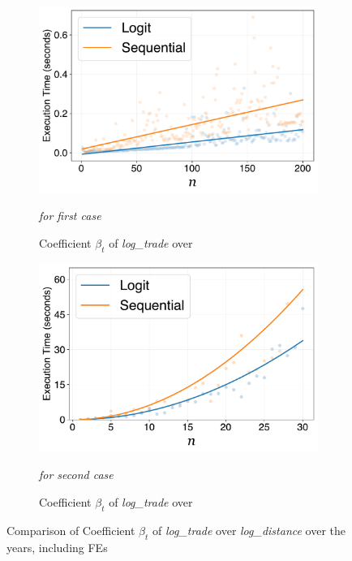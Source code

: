 \documentclass[../main.tex]{subfiles}
\begin{document}
\begin{figure}[H]
    \centering
    \begin{subfigure}[b]{0.45\linewidth}
        \centering
        \includegraphics[width=\linewidth]{linear.pdf}
        \vspace{-0.25cm}
        \caption{Coefficient $\beta_t$ of \textit{log\_trade} over} \textit{ for first case}
        \label{fig:subfig1}
    \end{subfigure}
    \hspace{0.05\linewidth}  %
    \begin{subfigure}[b]{0.45\linewidth}
        \centering
        \includegraphics[width=\linewidth]{squared.pdf}
        \vspace{-0.25cm}
        \caption{Coefficient $\beta_t$ of \textit{log\_trade} over} \textit{ for second case}
        \label{fig:subfig2}
    \end{subfigure}
    \caption{Comparison of Coefficient $\beta_t$ of \textit{log\_trade} over \textit{log\_distance} over the years, including FEs}
    \label{fig:main_figure}
\end{figure}
\end{document}
